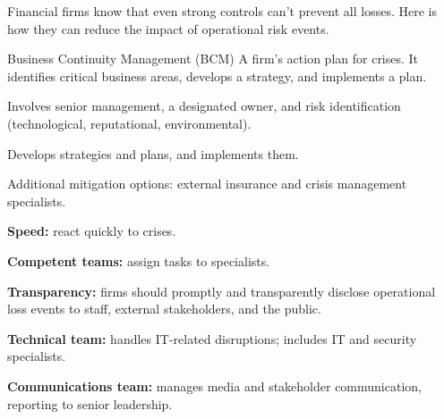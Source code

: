 Financial firms know that even strong controls can't prevent all losses. Here is
how they can reduce the impact of operational risk events.


\begin{ordefbox}{Business Continuity Management (BCM)}
A firm's action plan for crises. It identifies critical business areas, develops a
strategy, and implements a plan.
\end{ordefbox}

\begin{lettered}
\item Involves senior management, a designated owner, and risk identification
(technological, reputational, environmental).
\item Develops strategies and plans, and implements them.
\item Additional mitigation options: external insurance and crisis management
specialists.
\end{lettered}


\begin{lettered}
\item \textbf{Speed:} react quickly to crises.
\item \textbf{Competent teams:} assign tasks to specialists.
\item \textbf{Transparency:} firms should promptly and transparently disclose
operational loss events to staff, external stakeholders, and the public.
\end{lettered}

\begin{lettered}
\item \textbf{Technical team:} handles IT-related disruptions; includes IT and
security specialists.
\item \textbf{Communications team:} manages media and stakeholder communication,
reporting to senior leadership.
\end{lettered}


